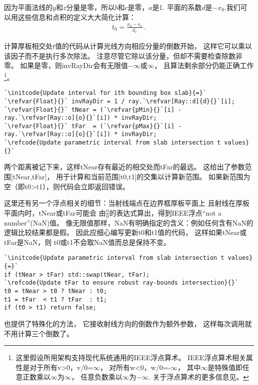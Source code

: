 因为平面法线的$y$和$z$分量是零，所以$b$和$c$是零，$a$是1.
平面的系数$d$是$-x_0$.我们可以用这些信息和点积的定义大大简化计算：
\begin{align*}
    t_0=\frac{x_0-o_x}{d_x}\, .
\end{align*}

计算厚板相交处$t$值的代码从计算光线方向相应分量的倒数开始，
这样它可以乘以该因子而不是执行多次除法。
注意尽管它除以该分量，但却不需要检查除数非零。
如果是零，则{\ttfamily invRayDir}会有无限值$-\infty$或$\infty$，
且算法剩余部分仍能正确工作
\footnote{这里假设所用架构支持现代系统通用的IEEE浮点算术。
IEEE浮点算术相关属性是对于所有{\ttfamily v>0}，{\ttfamily v/0=}$\infty$，
对所有{\ttfamily w<0}，{\ttfamily w/0=-}$\infty$，
其中$\infty$是特殊值即任意正数乘以$\infty$为$\infty$，
任意负数乘以$\infty$为$-\infty$.
关于浮点算术的更多信息见\protect{}。}。
\begin{lstlisting}
`\initcode{Update interval for ith bounding box slab}{=}`
`\refvar{Float}{}` invRayDir = 1 / ray.`\refvar[Ray::d]{d}{}`[i];
`\refvar{Float}{}` tNear = (`\refvar{pMin}{}`[i] - ray.`\refvar[Ray::o]{o}{}`[i]) * invRayDir;
`\refvar{Float}{}` tFar  = (`\refvar{pMax}{}`[i] - ray.`\refvar[Ray::o]{o}{}`[i]) * invRayDir;
`\refcode{Update parametric interval from slab intersection t values}{}`
\end{lstlisting}

两个距离被记下来，这样{\ttfamily tNear}存有最近的相交处而{\ttfamily tFar}的最远。
这给出了参数范围$[${\ttfamily tNear,tFar}$]$，
用于计算和当前范围$[${\ttfamily t0,t1}$]$的交集以计算新范围。
如果新范围为空（即{\ttfamily t0>t1}），则代码会立即返回错误。

这里还有另一个浮点相关的细节：当射线端点在边界框厚板平面上
且射线在厚板平面内时，{\ttfamily tNear}或{\ttfamily tFar}可能会
由$\frac{0}{0}$的表达式算出，得到IEEE浮点“not a number”(NaN)值。
像无限值那样，NaN有明确指定的含义：例如任何含有NaN的逻辑比较结果都是假。
因此应细心编写更新{\ttfamily t0}和{\ttfamily t1}值的代码，
这样如果{\ttfamily tNear}或{\ttfamily tFar}是NaN，则
{\ttfamily t0}或{\ttfamily t1}不会取NaN值而总是保持不变。
\begin{lstlisting}
`\initcode{Update parametric interval from slab intersection t values}{=}`
if (tNear > tFar) std::swap(tNear, tFar);
`\refcode{Update tFar to ensure robust ray-bounds intersection}{}`
t0 = tNear > t0 ? tNear : t0;
t1 = tFar  < t1 ? tFar  : t1;
if (t0 > t1) return false;
\end{lstlisting}

也提供了特殊化的方法，
它接收射线方向的倒数作为额外参数，
这样每次调用就不用计算三个倒数了。

